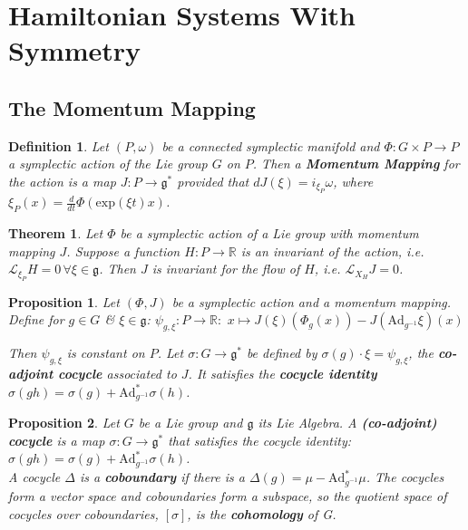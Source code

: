 \documentclass{article}
\newtheorem{thm}{Theorem}
\newtheorem{defn}{Definition}
\newtheorem{prop}{Proposition}
\begin{document}
\section{Hamiltonian Systems With Symmetry}

\subsection{The Momentum Mapping}

\begin{defn}

Let $(P,\omega)$ be a connected symplectic manifold and $\Phi: G \times P \to P$ a symplectic action of the Lie group $G$ on $P$. Then a \textbf{Momentum Mapping} for the action is a map $J:P \to \mathfrak{g}^*$ provided that $dJ (\xi) = i_{\xi_P} \omega$, where $\xi_P (x) = \frac{d}{dt}\Phi(\mathrm{exp}(\xi t) x)$.
\end{defn}

\begin{thm}

Let $\Phi$ be a symplectic action of a Lie group with momentum mapping $J$. Suppose a function $H: P \to \mathbb{R}$ is an invariant of the action, i.e. $\mathcal{L}_{\xi_P} H = 0 \hspace{2pt} \forall \xi \in \mathfrak{g}$. Then $J$ is invariant for the flow of $H$, i.e. $\mathcal{L}_{X_H}J = 0$.
\end{thm}

\begin{prop}

Let $(\Phi, J)$ be a symplectic action and a momentum mapping. Define for $g \in G$ \& $\xi \in \mathfrak{g}$:
$\psi_{g,\xi}:P \to \mathbb{R}: \hspace{4pt} x \mapsto J(\xi)(\Phi_g(x)) - J(\mathrm{Ad}_{g^{-1}}\xi)(x)$

Then $\psi_{g,\xi}$ is constant on $P$. Let $\sigma:G \to \mathfrak{g}^*$ be defined by $\sigma(g) \cdot \xi = \psi_{g,\xi}$, the \textbf{co-adjoint cocycle} associated to $J$. It satisfies the \textbf{cocycle identity} $\sigma(gh) = \sigma(g) + \mathrm{Ad}^*_{g^{-1}}\sigma(h)$.
\end{prop}

\begin{prop}

Let $G$ be a Lie group and $\mathfrak{g}$ its Lie Algebra. A \textbf{(co-adjoint) cocycle} is a map $\sigma: G \to \mathfrak{g}^*$ that satisfies the cocycle identity: $\sigma(gh) = \sigma(g) + \mathrm{Ad}^*_{g^{-1}} \sigma(h)$. \\
\indent A cocycle $\Delta$ is a \textbf{coboundary} if there is a $\Delta(g) = \mu - \mathrm{Ad}^*_{g^{-1}} \mu$. The cocycles form a vector space and coboundaries form a subspace, so the quotient space of cocycles over coboundaries, $[\sigma]$, is the \textbf{cohomology} of G.

\end{prop}
\end{document}
